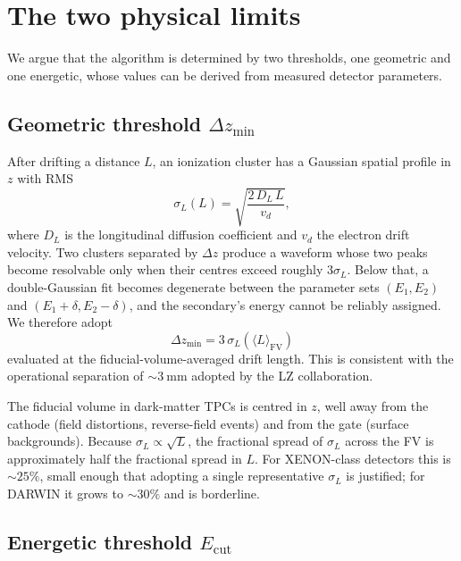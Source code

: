 \documentclass[11pt,a4paper]{article}
\begin{document}
\section{The two physical limits}

We argue that the algorithm is determined by two thresholds, one
geometric and one energetic, whose values can be derived from
measured detector parameters.

\subsection{Geometric threshold $\Delta z_{\min}$}

After drifting a distance $L$, an ionization cluster has a Gaussian
spatial profile in $z$ with RMS
\begin{equation}
    \sigma_L(L) = \sqrt{\frac{2\,D_L\,L}{v_d}},
    \label{eq:sigmaL}
\end{equation}
where $D_L$ is the longitudinal diffusion coefficient and $v_d$ the
electron drift velocity. Two clusters separated by $\Delta z$ produce
a waveform whose two peaks become resolvable only when their centres
exceed roughly $3\sigma_L$. Below that, a double-Gaussian fit
becomes degenerate between the parameter sets $(E_1,E_2)$ and
$(E_1+\delta, E_2-\delta)$, and the secondary's energy cannot be
reliably assigned. We therefore adopt
\begin{equation}
    \boxed{\;\Delta z_{\min} = 3\,\sigma_L(\langle L\rangle_{\mathrm{FV}})\;}
    \label{eq:dzmin}
\end{equation}
evaluated at the fiducial-volume-averaged drift length. This is
consistent with the operational separation of $\sim\!\SI{3}{\milli\meter}$
adopted by the LZ collaboration.

The fiducial volume in dark-matter TPCs is centred in $z$, well away
from the cathode (field distortions, reverse-field events) and from
the gate (surface backgrounds). Because $\sigma_L \propto \sqrt{L}$,
the fractional spread of $\sigma_L$ across the FV is approximately
half the fractional spread in $L$. For XENON-class detectors this is
$\sim\!25\%$, small enough that adopting a single representative
$\sigma_L$ is justified; for DARWIN it grows to $\sim\!30\%$ and is
borderline.

\subsection{Energetic threshold $E_{\mathrm{cut}}$}
\end{document}
